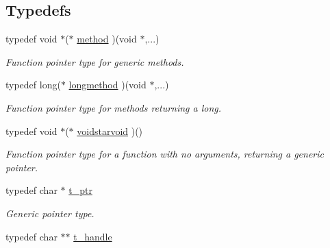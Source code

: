 \subsection*{Typedefs}
\begin{DoxyCompactItemize}
\item 
\hypertarget{group__datatypes_gac26ba0a173b50597f5738132e059b42d}{
typedef void $\ast$($\ast$ \hyperlink{group__datatypes_gac26ba0a173b50597f5738132e059b42d}{method} )(void $\ast$,...)}
\label{group__datatypes_gac26ba0a173b50597f5738132e059b42d}

\begin{DoxyCompactList}\small\item\em Function pointer type for generic methods. \item\end{DoxyCompactList}\item 
\hypertarget{group__datatypes_gac7e77a7761df347af29a272c2ddcb08b}{
typedef long($\ast$ \hyperlink{group__datatypes_gac7e77a7761df347af29a272c2ddcb08b}{longmethod} )(void $\ast$,...)}
\label{group__datatypes_gac7e77a7761df347af29a272c2ddcb08b}

\begin{DoxyCompactList}\small\item\em Function pointer type for methods returning a long. \item\end{DoxyCompactList}\item 
\hypertarget{group__datatypes_ga19aa0d8eb4efccb4ec2ebb5eaac0bdb0}{
typedef void $\ast$($\ast$ \hyperlink{group__datatypes_ga19aa0d8eb4efccb4ec2ebb5eaac0bdb0}{voidstarvoid} )()}
\label{group__datatypes_ga19aa0d8eb4efccb4ec2ebb5eaac0bdb0}

\begin{DoxyCompactList}\small\item\em Function pointer type for a function with no arguments, returning a generic pointer. \item\end{DoxyCompactList}\item 
\hypertarget{group__datatypes_ga70766a030fcd392d4574fa59b296a68e}{
typedef char $\ast$ \hyperlink{group__datatypes_ga70766a030fcd392d4574fa59b296a68e}{t\_\-ptr}}
\label{group__datatypes_ga70766a030fcd392d4574fa59b296a68e}

\begin{DoxyCompactList}\small\item\em Generic pointer type. \item\end{DoxyCompactList}\item 
\hypertarget{group__datatypes_ga0fe64aac41fd3ec071cce295a41d67ad}{
typedef char $\ast$$\ast$ \hyperlink{group__datatypes_ga0fe64aac41fd3ec071cce295a41d67ad}{t\_\-handle}}
\label{group__datatypes_ga0fe64aac41fd3ec071cce295a41d67ad}


\end{DoxyCompactItemize}
